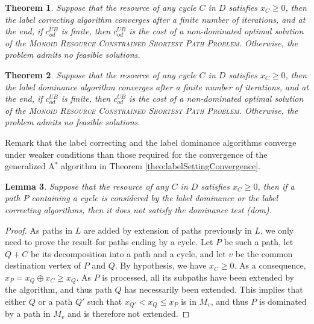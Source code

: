 \documentclass[11pt]{amsart}
\theoremstyle{plain}
\newtheorem{theo}{Theorem}
\newtheorem{lem}[theo]{Lemma}
\theoremstyle{remark}
\newcommand{\MRCSP}{\textsc{Monoid Resource Constrained Shortest Path Problem}\xspace}
\newcommand{\rplus}{\oplus}
\newcommand{\rgeq}{\geqslant}
\newcommand{\re}{x}
\begin{document}
\begin{theo}\label{theo:labelCorrectingConvergence}
Suppose that the resource of any cycle $C$ in $D$ satisfies $\re_{C}\rgeq 0$, then the label correcting algorithm converges after a finite number of iterations, and at the end, if  $c_{od}^{UB}$ is finite, then  $c_{od}^{UB}$ is the cost of a non-dominated optimal solution of the \MRCSP. Otherwise, the problem admits no feasible solutions.
\end{theo}

\begin{theo}\label{theo:labelDominanceConvergence}
Suppose that the resource of any cycle $C$ in $D$ satisfies $\re_{C}\rgeq 0$, then the label dominance algorithm converges after a finite number of iterations, and at the end, if  $c_{od}^{UB}$ is finite, then  $c_{od}^{UB}$ is the cost of a non-dominated optimal solution of the \MRCSP. Otherwise, the problem admits no feasible solutions.
\end{theo}

Remark that the label correcting and the label dominance algorithms converge under weaker conditions than those required for the convergence of the generalized A$^{*}$ algorithm in Theorem \ref{theo:labelSettingConvergence}. 

\begin{lem}\label{lem:labelCorrectingConv}
Suppose that the resource of any $C$ in $D$ satisfies $\re_{C}\rgeq 0$, then if a path $P$ containing a cycle is considered by the label dominance or the label correcting algorithms, then it does not satisfy the dominance test (dom).
\end{lem}


\begin{proof}
As paths in $L$ are added by extension of paths previously in $L$, we only need to prove the result for paths ending by a cycle. Let $P$ be such a path, let $Q + C$ be its decomposition into a path and a cycle, and let $v$ be the common destination vertex of $P$ and $Q$. By hypothesis, we have $\re_{C} \rgeq 0$. As a consequence, $\re_{P} =  \re_{Q} \rplus \re_{C} \rgeq \re_{Q}$. As $P$ is processed, all its subpaths have been extended by the algorithm, and thus path $Q$ has necessarily been extended. This implies that either $Q$ or a path $Q'$ such that $\re_{Q'} < \re_{Q} \leq \re_{P} $ is in $M_{v}$, and thus $P$ is dominated by a path in $M_{v}$ and is therefore not extended.
\end{proof}
\end{document}
